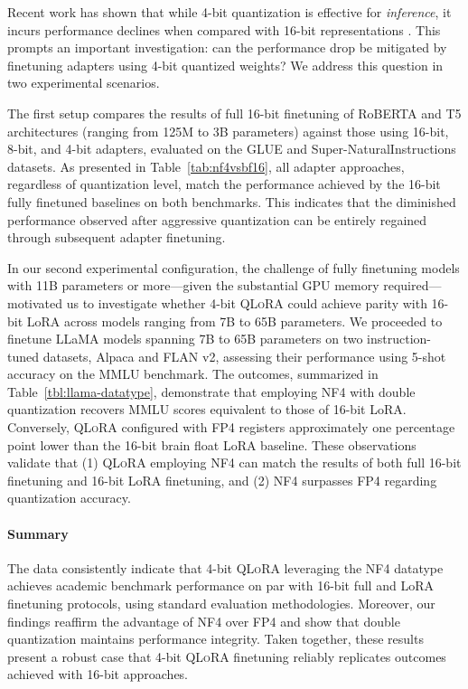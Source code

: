 Recent work has shown that while 4-bit quantization is effective for \emph{inference}, it incurs performance declines when compared with 16-bit representations \citep{dettmers2022case,frantar2022gptq}. This prompts an important investigation: can the performance drop be mitigated by finetuning adapters using 4-bit quantized weights? We address this question in two experimental scenarios.

The first setup compares the results of full 16-bit finetuning of RoBERTA and T5 architectures (ranging from 125M to 3B parameters) against those using 16-bit, 8-bit, and 4-bit adapters, evaluated on the GLUE and Super-NaturalInstructions datasets. As presented in Table~\ref{tab:nf4vsbf16}, all adapter approaches, regardless of quantization level, match the performance achieved by the 16-bit fully finetuned baselines on both benchmarks. This indicates that the diminished performance observed after aggressive quantization can be entirely regained through subsequent adapter finetuning.

In our second experimental configuration, the challenge of fully finetuning models with 11B parameters or more—given the substantial GPU memory required—motivated us to investigate whether 4-bit \textsc{QLoRA} could achieve parity with 16-bit LoRA across models ranging from 7B to 65B parameters. We proceeded to finetune LLaMA models spanning 7B to 65B parameters on two instruction-tuned datasets, Alpaca and FLAN v2, assessing their performance using 5-shot accuracy on the MMLU benchmark. The outcomes, summarized in Table~\ref{tbl:llama-datatype}, demonstrate that employing NF4 with double quantization recovers MMLU scores equivalent to those of 16-bit LoRA. Conversely, \textsc{QLoRA} configured with FP4 registers approximately one percentage point lower than the 16-bit brain float LoRA baseline. These observations validate that (1) \textsc{QLoRA} employing NF4 can match the results of both full 16-bit finetuning and 16-bit LoRA finetuning, and (2) NF4 surpasses FP4 regarding quantization accuracy.

\paragraph{Summary} The data consistently indicate that 4-bit \textsc{QLoRA} leveraging the NF4 datatype achieves academic benchmark performance on par with 16-bit full and LoRA finetuning protocols, using standard evaluation methodologies. Moreover, our findings reaffirm the advantage of NF4 over FP4 and show that double quantization maintains performance integrity. Taken together, these results present a robust case that 4-bit \textsc{QLoRA} finetuning reliably replicates outcomes achieved with 16-bit approaches.

